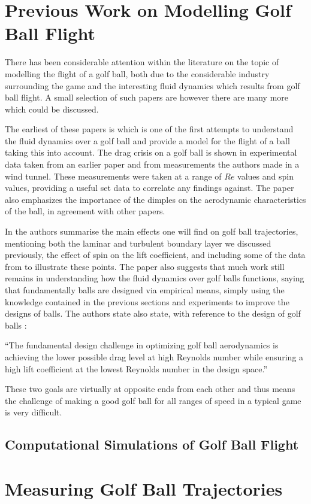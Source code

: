\section{Previous Work on Modelling Golf Ball Flight}

There has been considerable attention within the literature on the topic of modelling the flight of a
golf ball, both due to the considerable industry surrounding the game and the interesting fluid
dynamics which results from golf ball flight. A small selection of such papers are
\citet{Smits2004,Bearman1976,Penner2003,Alam2011,Kensrud2010,Leong2007} however there are many more
which could be discussed.

The earliest of these papers is \citet{Bearman1976} which is one of the first attempts
to understand the fluid dynamics over a golf ball and provide a model for the flight of a ball taking
this into account. The drag crisis on a golf ball is shown in experimental data taken from an earlier
paper and from measurements the authors made in a wind tunnel. These measurements were taken at a range
of $Re$ values and spin values, providing a useful set data to correlate any findings against. The
paper also emphasizes the importance of the dimples on the aerodynamic characteristics of the ball,
in agreement with other papers.

In \citet{Smits2004} the authors summarise the main effects one will find on golf ball trajectories,
mentioning both the laminar and turbulent boundary layer we discussed previously, the effect of spin
on the lift coefficient, and including some of the data from \citet{Bearman1976} to illustrate these
points. The paper also suggests that much work still remains in understanding how the fluid dynamics
over golf balls functions, saying that fundamentally balls are designed via empirical means, simply
using the knowledge contained in the previous sections and experiments to improve the designs of balls.
The authors state also state, with reference to the design of golf balls \citet[page 10]{Smits2004}:

``The fundamental design challenge in optimizing golf ball aerodynamics is achieving the lower possible drag level at high Reynolds number while ensuring a high lift coefficient at the lowest Reynolds number in the design space.''

These two goals are virtually at opposite ends from each other and thus means the challenge of making
a good golf ball for all ranges of speed in a typical game is very difficult.

\subsection{Computational Simulations of Golf Ball Flight}

\citet{Smith2010,Beratlis2012Numerical}

\section{Measuring Golf Ball Trajectories}

\citet{Martin2012}